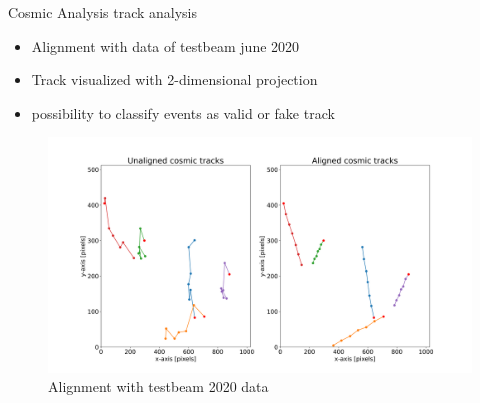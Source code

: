 \documentclass{beamer}
\begin{document}
\begin{frame}{Cosmic Analysis}
  \LARGE track analysis \normalsize \\[.1cm]
  \begin{itemize}
    \item Alignment with data of testbeam june 2020
    \item Track visualized with 2-dimensional projection
    \item possibility to classify events as valid or fake track
  \end{itemize}
  \begin{figure}[H]
    \centering
    \includegraphics[width=.8\textwidth]{track_visual}
    \caption{Alignment with testbeam 2020 data}
  \end{figure}
\end{frame}
\end{document}
